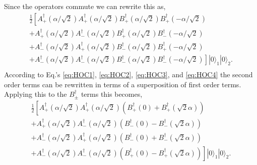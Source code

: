 \documentclass[aps,prl,twocolumn,amsmath,amssymb,nofootinbib,superscriptaddress]{revtex4}
\newcommand{\ket}[1]{|#1\rangle}
\begin{document}
Since the operators commute we can rewrite this as,
\begin{eqnarray}
\frac{1}{2}\left[A_+^\dag(\alpha/\sqrt{2}) A_+^\dag(\alpha/\sqrt{2}) B_+^\dag(\alpha/\sqrt{2})  B_+^\dag(-\alpha/\sqrt{2}) \right. \nonumber \\
+ A_+^\dag(\alpha/\sqrt{2}) A_-^\dag(\alpha/\sqrt{2}) B_+^\dag(\alpha/\sqrt{2}) B_-^\dag(-\alpha/\sqrt{2}) \nonumber \\
+ A_-^\dag(\alpha/\sqrt{2})A_+^\dag(\alpha/\sqrt{2})B_-^\dag(\alpha/\sqrt{2})  B_+^\dag(-\alpha/\sqrt{2}) \nonumber \\
\left.+ A_-^\dag(\alpha/\sqrt{2}) A_-^\dag(\alpha/\sqrt{2})B_-^\dag(\alpha/\sqrt{2})B_-^\dag(-\alpha/\sqrt{2})\right] \ket{0}_1 \ket{0}_2.\nonumber \\
\end{eqnarray}
According to Eq.'s \ref{eq:HOC1}, \ref{eq:HOC2}, \ref{eq:HOC3}, and \ref{eq:HOC4} the second order terms can be rewritten in terms of a superposition of first order terms. Applying this to the $B_{\pm}^{\dag}$ terms this becomes,
\begin{eqnarray}
\frac{1}{2}\left[A_+^\dag(\alpha/\sqrt{2}) A_+^\dag(\alpha/\sqrt{2}) \left(B_+^\dag(0)+  B_+^\dag(\sqrt{2}\alpha)\right) \right.\nonumber \\
+ A_+^\dag(\alpha/\sqrt{2}) A_-^\dag(\alpha/\sqrt{2}) \left(B_-^\dag(0)-  B_-^\dag(\sqrt{2}\alpha)\right) \nonumber \\
+ A_-^\dag(\alpha/\sqrt{2})A_+^\dag(\alpha/\sqrt{2})\left(B_-^\dag(0)+  B_-^\dag(\sqrt{2}\alpha)\right) \nonumber \\
\left.+ A_-^\dag(\alpha/\sqrt{2}) A_-^\dag(\alpha/\sqrt{2})\left(B_+^\dag(0)-  B_+^\dag(\sqrt{2}\alpha)\right)\right]\ket{0}_1 \ket{0}_2.\nonumber \\
\end{eqnarray}
\end{document}
